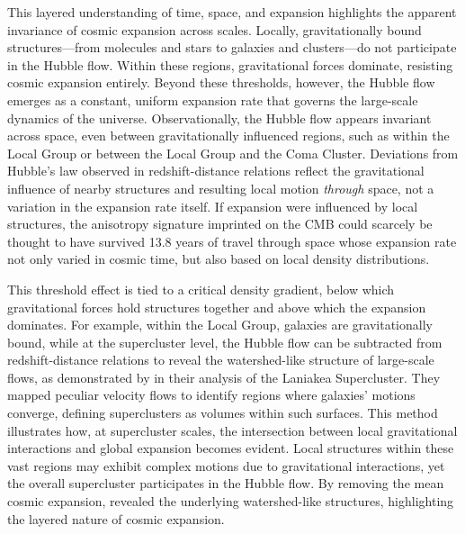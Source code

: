 \documentclass[aps,rmp,groupedaddress,twocolumn,10pt]{revtex4-2}
\begin{document}
This layered understanding of time, space, and expansion highlights the apparent invariance of cosmic expansion across scales. Locally, gravitationally bound structures---from molecules and stars to galaxies and clusters---do not participate in the Hubble flow. Within these regions, gravitational forces dominate, resisting cosmic expansion entirely. Beyond these thresholds, however, the Hubble flow emerges as a constant, uniform expansion rate that governs the large-scale dynamics of the universe. Observationally, the Hubble flow appears invariant across space, even between gravitationally influenced regions, such as within the Local Group or between the Local Group and the Coma Cluster. Deviations from Hubble's law observed in redshift-distance relations reflect the gravitational influence of nearby structures and resulting local motion \textit{through} space, not a variation in the expansion rate itself. If expansion were influenced by local structures, the anisotropy signature imprinted on the CMB could scarcely be thought to have survived 13.8 years of travel through space whose expansion rate not only varied in cosmic time, but also based on local density distributions.

This threshold effect is tied to a critical density gradient, below which gravitational forces hold structures together and above which the expansion dominates. For example, within the Local Group, galaxies are gravitationally bound, while at the supercluster level, the Hubble flow can be subtracted from redshift-distance relations to reveal the watershed-like structure of large-scale flows, as demonstrated by \citet{Tully2014} in their analysis of the Laniakea Supercluster. They mapped peculiar velocity flows to identify regions where galaxies' motions converge, defining superclusters as volumes within such surfaces. This method illustrates how, at supercluster scales, the intersection between local gravitational interactions and global expansion becomes evident. Local structures within these vast regions may exhibit complex motions due to gravitational interactions, yet the overall supercluster participates in the Hubble flow. By removing the mean cosmic expansion, \citet{Tully2014} revealed the underlying watershed-like structures, highlighting the layered nature of cosmic expansion.
\end{document}
